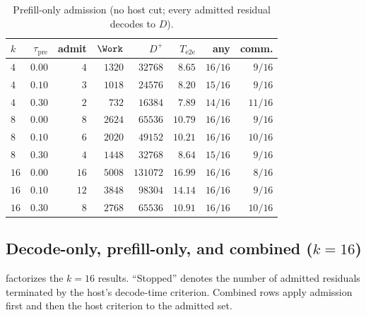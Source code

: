 \begin{table}[t]
\centering
\caption{Prefill-only admission (no host cut; every admitted residual decodes to $D$).}
\label{tab:ablate-prefill}
\scriptsize
\setlength{\tabcolsep}{3.0pt}
\begin{tabular}{@{}lrrrrrrr@{}}
\toprule
$k$ & $\tau_{\mathrm{pre}}$ & admit & $\Work$ & $D^{+}$ & $T_{\mathrm{e2e}}$ & any & comm. \\
\midrule
$4$ & $0.00$ & $4$ & $1320$ & $32768$ & $8.65$ & $16/16$ & $9/16$ \\
\rowcolor{tblalt}
$4$ & $0.10$ & $3$ & $1018$ & $24576$ & $8.20$ & $15/16$ & $9/16$ \\
$4$ & $0.30$ & $2$ & $732$ & $16384$ & $7.89$ & $14/16$ & $11/16$ \\
\midrule
$8$ & $0.00$ & $8$ & $2624$ & $65536$ & $10.79$ & $16/16$ & $9/16$ \\
\rowcolor{tblalt}
$8$ & $0.10$ & $6$ & $2020$ & $49152$ & $10.21$ & $16/16$ & $10/16$ \\
$8$ & $0.30$ & $4$ & $1448$ & $32768$ & $8.64$ & $15/16$ & $9/16$ \\
\midrule
$16$ & $0.00$ & $16$ & $5008$ & $131072$ & $16.99$ & $16/16$ & $8/16$ \\
\rowcolor{tblalt}
$16$ & $0.10$ & $12$ & $3848$ & $98304$ & $14.14$ & $16/16$ & $9/16$ \\
$16$ & $0.30$ & $8$ & $2768$ & $65536$ & $10.91$ & $16/16$ & $10/16$ \\
\bottomrule
\end{tabular}
\end{table}

\subsection{Decode-only, prefill-only, and combined ($k{=}16$)}
\label{sec:ablate-combine}

 factorizes the $k{=}16$ results.
``Stopped'' denotes the number of admitted residuals terminated by the host's decode-time criterion.
Combined rows apply admission first and then the host criterion to the admitted set.

